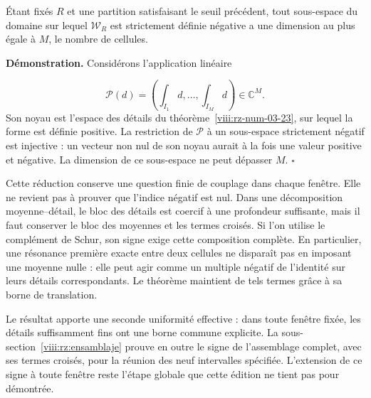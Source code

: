 Étant fixés \(R\) et une partition satisfaisant le seuil précédent, tout sous-espace du domaine sur lequel \(\mathscr W_R\) est strictement définie négative a une dimension au plus égale à \(M\), le nombre de cellules.

\textbf{Démonstration.} Considérons l'application linéaire

\[
\mathcal P(d)=\left(\int_{I_1}d,\ldots,
\int_{I_M}d\right)\in\mathbb C^M.
\]
Son noyau est l'espace des détails du théorème~\ref{viii:rz-num-03-23}, sur lequel la forme est définie positive. La restriction de \(\mathcal P\) à un sous-espace strictement négatif est injective : un vecteur non nul de son noyau aurait à la fois une valeur positive et négative. La dimension de ce sous-espace ne peut dépasser \(M\). \hfill\(\square\)

Cette réduction conserve une question finie de couplage dans chaque fenêtre. Elle ne revient pas à prouver que l’indice négatif est nul. Dans une décomposition moyenne–détail, le bloc des détails est coercif à une profondeur suffisante, mais il faut conserver le bloc des moyennes et les termes croisés. Si l’on utilise le complément de Schur, son signe exige cette composition complète. En particulier, une résonance première exacte entre deux cellules ne disparaît pas en imposant une moyenne nulle : elle peut agir comme un multiple négatif de l’identité sur leurs détails correspondants. Le théorème maintient de tels termes grâce à sa borne de translation.

Le résultat apporte une seconde uniformité effective : dans toute fenêtre fixée, les détails suffisamment fins ont une borne commune explicite. La sous-section~\ref{viii:rz:ensamblaje} prouve en outre le signe de l'assemblage complet, avec ses termes croisés, pour la réunion des neuf intervalles spécifiée. L'extension de ce signe à toute fenêtre reste l'étape globale que cette édition ne tient pas pour démontrée.
